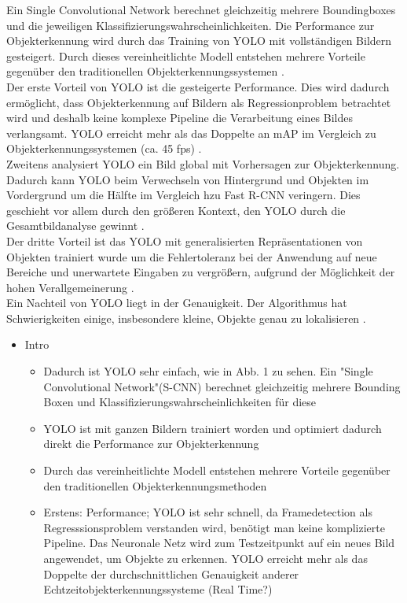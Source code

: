 {{	Ein \glqq Single Convolutional Network\grqq{} berechnet gleichzeitig mehrere Boundingboxes und die jeweiligen Klassifizierungswahrscheinlichkeiten. Die Performance zur Objekterkennung wird durch das Training von YOLO mit vollständigen Bildern gesteigert. Durch dieses vereinheitlichte Modell entstehen mehrere Vorteile gegenüber den traditionellen Objekterkennungssystemen \citep{Plastiras2018}. \\
	Der erste Vorteil von YOLO ist die gesteigerte Performance. Dies wird dadurch ermöglicht, dass Objekterkennung auf Bildern als Regressionproblem betrachtet wird und deshalb keine komplexe Pipeline die Verarbeitung eines Bildes verlangsamt. YOLO erreicht mehr als das Doppelte an mAP  im Vergleich zu Objekterkennungssystemen (ca. 45 fps) \citep{Plastiras2018}. \\
	Zweitens analysiert YOLO ein Bild global mit Vorhersagen zur Objekterkennung. Dadurch kann YOLO beim Verwechseln von Hintergrund und Objekten im Vordergrund um die Hälfte im Vergleich hzu Fast R-CNN veringern. Dies geschieht vor allem durch den größeren Kontext, den YOLO durch die Gesamtbildanalyse gewinnt \citep{Plastiras2018}. \\
	Der dritte Vorteil ist das YOLO mit generalisierten Repräsentationen von Objekten trainiert wurde um die Fehlertoleranz bei der Anwendung auf neue Bereiche und unerwartete Eingaben zu vergrößern, aufgrund der Möglichkeit der hohen Verallgemeinerung \citep{Plastiras2018}. \\
	Ein Nachteil von YOLO liegt in der Genauigkeit. Der Algorithmus hat Schwierigkeiten einige, insbesondere kleine, Objekte genau zu lokalisieren \citep{Plastiras2018}. \\}
	\begin{itemize}
		\item Intro
		\begin{itemize}
			\item Dadurch ist YOLO sehr einfach, wie in Abb. 1 zu sehen. Ein "Single Convolutional Network"(S-CNN) berechnet gleichzeitig mehrere Bounding Boxen und Klassifizierungswahrscheinlichkeiten für diese
			\item YOLO ist mit ganzen Bildern trainiert worden und optimiert dadurch direkt die Performance zur Objekterkennung
			\item Durch das vereinheitlichte Modell entstehen mehrere Vorteile gegenüber den traditionellen Objekterkennungsmethoden
			\item Erstens: Performance; YOLO ist sehr schnell, da Framedetection als Regresssionsproblem verstanden wird, benötigt man keine komplizierte Pipeline. Das Neuronale Netz wird zum Testzeitpunkt auf ein neues Bild angewendet, um Objekte zu erkennen. YOLO erreicht mehr als das Doppelte der durchschnittlichen Genauigkeit anderer Echtzeitobjekterkennungssysteme (Real Time?)

\end{itemize}
\end{itemize}}
